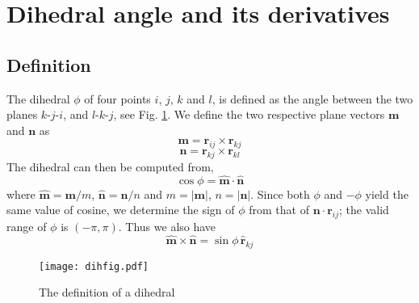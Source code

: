 \documentclass{article}
\begin{document}
\newcommand{\vct}[1]{\mathbf{#1}}
\newcommand{\vx}{\vct{x}}
\newcommand{\vy}{\vct{y}}
\newcommand{\vz}{\vct{z}}
\newcommand{\vm}{\vct{m}}
\newcommand{\vn}{\vct{n}}
\newcommand{\vr}{\vct{r}}
\newcommand{\vxh}{\hat{\vct{x}}}
\newcommand{\vyh}{\hat{\vct{y}}}
\newcommand{\vzh}{\hat{\vct{z}}}
\newcommand{\vmh}{\hat{\vct{m}}}
\newcommand{\vnh}{\hat{\vct{n}}}
\newcommand{\vrh}{\hat{\vct{r}}}
\newcommand{\vmhh}{\hat{\hat{\vct{m}}}}
\newcommand{\vnhh}{\hat{\hat{\vct{n}}}}
\newcommand{\diphi}{\nabla_i \phi}
\newcommand{\djphi}{\nabla_j \phi}
\newcommand{\dkphi}{\nabla_k \phi}
\newcommand{\dlphi}{\nabla_l \phi}

\section{Dihedral angle and its derivatives}

\subsection{Definition}

The dihedral $\phi$ of four points $i$, $j$, $k$ and $l$, 
is defined as the angle between the two planes 
$k$-$j$-$i$, and $l$-$k$-$j$, see Fig. \ref{dihfig}.
%
We define the two respective plane vectors $\vm$ and $\vn$ as
\begin{equation}
\vm = \vr_{ij} \times \vr_{kj}
\label{eq:m}
\end{equation}
%
\begin{equation}
\vn = \vr_{kj} \times \vr_{kl} 
\label{eq:n}
\end{equation}
%
The dihedral can then be computed from,
\begin{equation}
  \cos \phi = \vmh \cdot \vnh
  \label{eq:cosphi}
\end{equation}
%
where $\vmh = \vm/m$, $\vnh = \vn/n$
%
and $m = | \vm |$, $n = | \vn |$.
%
Since both $\phi$ and $-\phi$ yield the same value of cosine,
we determine the sign of $\phi$ from that of $\vn \cdot \vr_{ij}$;
the valid range of $\phi$ is $(-\pi, \pi)$.
Thus we also have 
\begin{equation}
  \vmh \times \vnh  = \sin \phi \, \vrh_{kj}
  \label{eq:sinphi}
\end{equation}

%
\begin{figure}[h]
\begin{center}
\texttt{[image: dihfig.pdf]}
\caption{\label{dihfig}The definition of a dihedral}
\end{center}
\end{figure}
\end{document}
